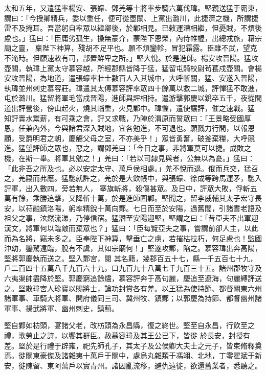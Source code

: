\begin{pinyinscope}
 太和五年，又遣猛率楊安、張蠔、鄧羌等十將率步騎六萬伐瑋。堅親送猛于霸東，謂曰：「今授卿精兵，委以重任，便可從壺關、上黨出潞川，此捷濟之機，所謂捷雷不及掩耳。吾當躬自率眾以繼卿後，於鄴相見。已敕運漕相繼，但憂賊，不煩後慮也。」猛曰：「臣庸劣孤生，操無豪介，蒙陛下恩榮，內侍帷幄，出總戎旅，藉宗廟之靈，
 稟陛下神算，殘胡不足平也。願不煩鑾軫，冒犯霜露。臣雖不武，望克不淹時。但願速敕有司，部置鮮卑之所。」堅大悅。於是進師。楊安攻晉陽。猛攻壺關，執瑋上黨太守慕容越，所經郡縣皆降于猛，猛留屯騎校尉茍萇戍壺關。會楊安攻晉陽，為地道，遣張蠔率壯士數百人入其城中，大呼斬關，猛、安遂入晉陽，執瑋並州刺史慕容莊。瑋遣其太傅慕容評率眾四十餘萬以救二城，評憚猛不敢進，屯於潞川。猛留將軍毛當戍晉陽，進師與評相持。遣游擊郭慶以銳卒五千，夜從間道出評營後，傍山起火，燒其輜重，火見鄴中。瑋懼，遣使讓評，催之速戰。猛
 知評賣水鬻薪，有可乘之會，評又求戰，乃陣於渭原而誓眾曰：「王景略受國厚恩，任兼內外，今與諸君深入賊地，宜各勉進，不可退也。願戮力行間，以報恩顧，受爵明君之朝，慶觴父母之室，不亦美乎！」眾皆勇奮，破釜棄糧，大呼競進。猛望評師之眾也，惡之，謂鄧羌曰：「今日之事，非將軍莫可以捷。成敗之機，在斯一舉。將軍其勉之！」羌曰：「若以司隸見與者，公無以為憂。」猛曰：「此非吾之所及也。必以安定太守、萬戶侯相處。」羌不悅而退。俄而兵交，猛召之，羌寢而弗應。猛馳就許之，羌於是大飲帳中，與張蠔、徐成等跨馬運矛，馳入評軍，出入數四，旁若無人，
 搴旗斬將，殺傷甚眾。及日中，評眾大敗，俘斬五萬有餘，乘勝追擊，又降斬十萬，於是進師圍鄴。堅聞之，留李威輔其太子宏守長安，以苻融鎮洛陽，躬率精銳十萬向鄴。七日而至於安陽，過舊閭，引諸耆老語及祖父之事，泫然流涕，乃停信宿。猛潛至安陽迎堅，堅謂之曰：「昔亞夫不出軍迎漢文，將軍何以臨敵而棄眾也？」猛曰：「臣每覽亞夫之事，嘗謂前卻人主，以此而為名將，竊未多之。臣奉陛下神算，擊垂亡之虜，若摧枯拉朽，何足慮也！監國沖幼，鑾駕遠臨，脫有不虞，其如宗廟何！」堅遂攻鄴，陷之。慕容瑋出奔高陽，堅將郭慶執而送之。堅入鄴宮，閱
 其名籍，幾郡百五十七，縣一千五百七十九，戶二百四十五萬八千九百六十九，口九百九十八萬七千九百三十五。諸州郡牧守及六夷渠帥盡降於堅。郭慶窮追餘燼，慕容評奔于高句麗，慶追至遼海，句麗縛評送之。堅散瑋宮人珍寶以賜將士，論功封賞各有差。以王猛為使持節、都督關東六州諸軍事、車騎大將軍、開府儀同三司、冀州牧、鎮鄴；以郭慶為持節、都督幽州諸軍事、揚武將軍、幽州刺史，鎮薊。



 堅自鄴如枋頭，宴諸父老，改枋頭為永昌縣，復之終世。堅至自永昌，行飲至之禮，歌勞止之詩，以饗其群臣。赦慕容瑋及其王公已下，皆徙
 於長安，封授有差。堅於是行禮于辟雍，祀先師孔子，其太子及公侯卿大夫士之元子，皆束脩釋奠焉。徙關東豪傑及諸雜夷十萬戶于關中，處烏丸雜類于馮翊、北地，丁零翟斌于新安，徙陳留、東阿萬戶以實青州。諸因亂流移，避仇遠徙，欲還舊業者，悉聽之。




\end{pinyinscope}

